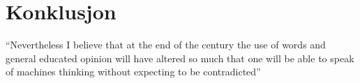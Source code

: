 \section{Konklusjon}

\begin{pquotation}{\cite[442]{Turing1950}}
    ``Nevertheless I believe that at the
    end of the century the use of words and general educated opinion will have
    altered so much that one will be able to speak of machines thinking without
    expecting to be contradicted''
\end{pquotation}
